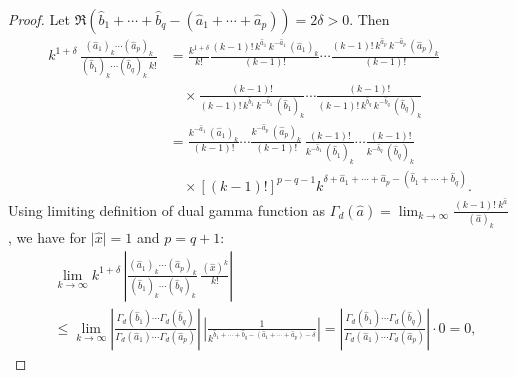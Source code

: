 \documentclass[11pt,a4paper,fleqn]{article}
\numberwithin{equation}{section}
\numberwithin{lemma}{section}
\numberwithin{theorem}{section}
\numberwithin{corollary}{section}
\begin{document}
\begin{proof}
	Let $\Re ({\widehat{b}_1 + \cdots + \widehat{b}_q - (\widehat{a}_1 +  \cdots + \widehat{a}_p)}) = 2 \delta > 0$. Then %
	\begin{align}
		k^{1 + \delta} \, \frac{ (\widehat{a}_1)_k \cdots  (\widehat{a}_p)_k}{(\widehat{b}_1)_k \cdots (\widehat{b}_q)_k \, k!} & = 	\frac{k^{1 + \delta}}{k !} \frac{(k - 1)! \, k^{\widehat{a}_1} \, k^{-\widehat{a}_1} \, (\widehat{a}_1)_k}{(k - 1)!} \cdots \frac{(k - 1)! \, k^{\widehat{a}_p} \, k^{-\widehat{a}_p} \, (\widehat{a}_p)_k}{(k - 1)!} \nonumber\\
		& \quad \times  \frac{ (k - 1)!}{(k - 1)! \, k^{\widehat{b}_1} \, k^{-\widehat{b}_1} \, (\widehat{b}_1)_k} \cdots \frac{ (k - 1)!}{(k - 1)! \, k^{\widehat{b}_q} \, k^{-\widehat{b}_q} \, (\widehat{b}_q)_k}\nonumber\\
		& = \frac{ k^{-\widehat{a}_1} \, (\widehat{a}_1)_k}{(k - 1)!} \cdots \frac{ k^{-\widehat{a}_p} \, (\widehat{a}_p)_k}{(k - 1)!}  \, \frac{  (k - 1)!}{k^{-\widehat{b}_1} \, (\widehat{b}_1)_k} \cdots \frac{  (k - 1)!}{k^{-\widehat{b}_q} \, (\widehat{b}_q)_k} \nonumber\\
		& \quad \times [(k - 1)!]^{p - q - 1}  k^{\delta +  \widehat{a}_1 +  \cdots + \widehat{a}_p - (\widehat{b}_1 + \cdots + \widehat{b}_q)}.
	\end{align} 
	Using limiting definition of dual gamma function as $\Gamma_d (\widehat{a}) = \lim_{k \rightarrow \infty} \frac{(k-1)! \ k^{\widehat{a}}}{(\widehat{a})_k}$, we have for $\vert \widehat{x}\vert = 1$ and $p = q + 1$:
	\begin{align}
	&	\lim_{k \rightarrow \infty}	k^{1 + \delta} \, \left \vert \frac{(\widehat{a}_1)_k \cdots (\widehat{a}_p)_k}{(\widehat{b}_1)_k \cdots (\widehat{b}_q)_k} \, \frac{ (\widehat{x})^k}{k!}\right \vert\nonumber\\
		& \le \lim_{k \rightarrow \infty} \left \vert \frac{\Gamma_d (\widehat{b}_1) \cdots \Gamma_d(\widehat{b}_q)}{\Gamma_d (\widehat{a}_1) \cdots \Gamma_d (\widehat{a}_p)} \right \vert \, \left \vert \frac{1}{k^{\widehat{b}_1 + \cdots + \widehat{b}_q - (\widehat{a}_1 +  \cdots + \widehat{a}_p) - \delta}} \right \vert = \left \vert \frac{\Gamma_d (\widehat{b}_1) \cdots \Gamma_d(\widehat{b}_q)}{\Gamma_d (\widehat{a}_1) \cdots \Gamma_d (\widehat{a}_p)} \right \vert \cdot  0 = 0,

\end{align}
\end{proof}
\end{document}
